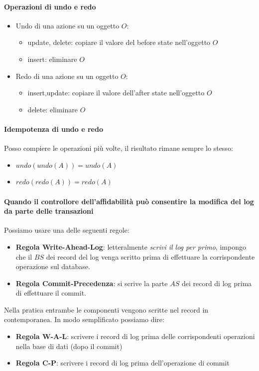 \paragraph{Operazioni di undo e redo}
\begin{itemize}
	\item Undo di una azione su un oggetto $O$:
	\begin{itemize}
		\item update, delete: copiare il valore del before state nell'oggetto $O$
		\item insert: eliminare $O$
	\end{itemize}
	\item Redo di una azione su un oggetto $O$:
	\begin{itemize}
		\item insert,update: copiare il valore dell'after state nell'oggetto $O$
		\item delete: eliminare $O$
	\end{itemize}
\end{itemize}
\paragraph{Idempotenza di undo e redo} Posso compiere le operazioni più volte, il risultato rimane sempre lo stesso:
\begin{itemize}
	\item $undo(undo(A))=undo(A)$
	\item $redo(redo(A))=redo(A)$
\end{itemize}
\paragraph{Quando il controllore dell'affidabilità può consentire la modifica del log da parte delle transazioni}
Possiamo usare una delle seguenti regole:
\begin{itemize}
	\item \textbf{Regola Write-Ahead-Log}: letteralmente \emph{scrivi il log per primo}, impongo che il $BS$ dei record del log venga scritto prima di effettuare la corrispondente operazione sul database. 
	\item \textbf{Regola Commit-Precedenza}: si scrive la parte $AS$ dei record di log prima di effettuare il commit.
\end{itemize}
Nella pratica entrambe le componenti vengono scritte nel record in contemporanea. In modo semplificato possiamo dire:
\begin{itemize}
	\item \textbf{Regola W-A-L}: scrivere i record di log prima delle corrispondenti operazioni nella base di dati (dopo il commit)
	\item \textbf{Regola C-P}: scrivere i record di log prima dell'operazione di commit
\end{itemize}
